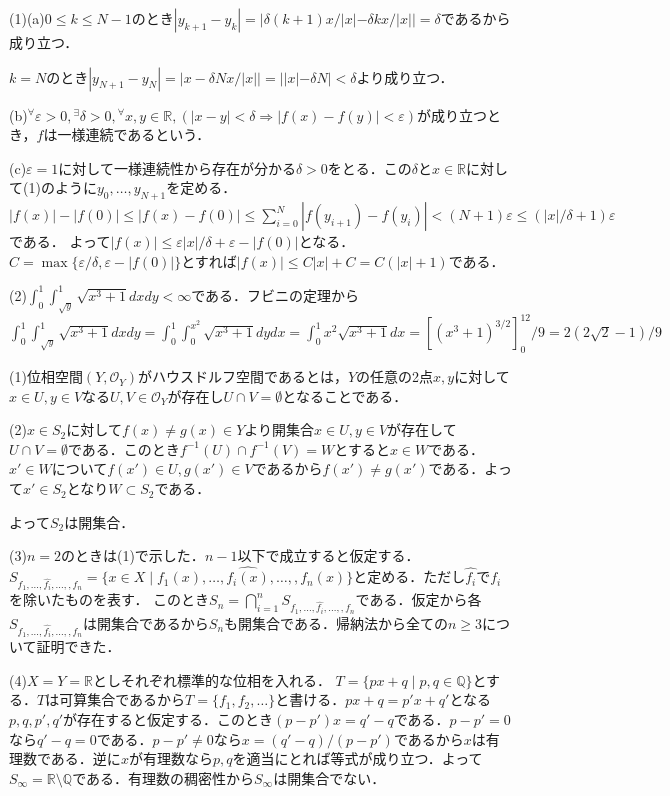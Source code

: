 \documentclass[
		book,
		head_space=20mm,
		foot_space=20mm,
		gutter=10mm,
		line_length=190mm
]{jlreq}
\begin{document}
(1)(a)$0\le k \le N-1$のとき$|y_{k+1}-y_k|=|\delta(k+1)x/|x|-\delta kx/|x||=\delta$であるから成り立つ．

$k=N$のとき$|y_{N+1}-y_N|=|x-\delta Nx/|x||=||x|-\delta N|<\delta$より成り立つ．

(b)${}^{\forall} \varepsilon>0,{}^{\exists} \delta>0,{}^\forall x,y \in \mathbb{R},(|x-y|<\delta \Rightarrow |f(x)-f(y)|<\varepsilon)$が成り立つとき，$f$は一様連続であるという．

(c)$\varepsilon=1$に対して一様連続性から存在が分かる$\delta>0$をとる．この$\delta$と$x \in \mathbb{R}$に対して(1)のように$y_0,\dots,y_{N+1}$を定める．
$|f(x)|-|f(0)|\le |f(x)-f(0)|\le \sum_{i=0}^N |f(y_{i+1})-f(y_i)|<(N+1)\varepsilon\le (|x|/\delta+1)\varepsilon$である．
よって$|f(x)|\le \varepsilon|x|/\delta+\varepsilon-|f(0)|$となる．
$C=\max \{ \varepsilon/\delta,\varepsilon-|f(0)|\}$とすれば$|f(x)|\le C|x|+C =C(|x|+1)$である．

(2)$\int_0^1\int_{\sqrt{y}}^1 \sqrt{x^3+1}dxdy<\infty$である．フビニの定理から$\int_0^1\int_{\sqrt{y}}^1 \sqrt{x^3+1}dxdy=\int_0^1\int_0^{x^2} \sqrt{x^3+1}dydx=\int_0^1x^2 \sqrt{x^3+1}dx=[(x^3+1)^{3/2}]_0^12/9=2(2\sqrt{2}-1)/9$

(1)位相空間$(Y,\mathcal{O}_Y)$がハウスドルフ空間であるとは，$Y$の任意の2点$x,y$に対して$x \in U,y \in V$なる$U,V \in \mathcal{O}_Y$が存在し$U \cap V =\emptyset$となることである．

(2)$x \in S_2$に対して$f(x)\neq g(x)\in Y$より開集合$x \in U,y \in V$が存在して$U \cap V=\emptyset$である．このとき$f^{-1}(U)\cap f^{-1}(V)=W$とすると$x \in W$である．$x' \in W$について$f(x')\in U,g(x')\in V$であるから$f(x')\neq g(x')$である．よって$x' \in S_2$となり$W \subset S_2$である．

よって$S_2$は開集合．

(3)$n=2$のときは(1)で示した．$n-1$以下で成立すると仮定する．
$S_{f_1,\dots,\hat{f_i},\dots,,f_n}=\{ x \in X \mid f_1(x),\dots,\hat{f_i(x)},\dots,,f_n(x)\}$と定める．ただし$\hat{f_i}$で$f_i$を除いたものを表す．
このとき$S_n=\bigcap\limits_{i=1}^n S_{f_1,\dots,\hat{f_i},\dots,,f_n}$である．仮定から各$S_{f_1,\dots,\hat{f_i},\dots,,f_n}$は開集合であるから$S_n$も開集合である．帰納法から全ての$n\ge 3$について証明できた．

(4)$X=Y=\mathbb{R}$としそれぞれ標準的な位相を入れる．
$T=\{ px+q \mid p,q \in \mathbb{Q}\}$とする．$T$は可算集合であるから$T=\{ f_1,f_2,\dots\}$と書ける．$px+q=p'x+q'$となる$p,q,p',q'$が存在すると仮定する．このとき$(p-p')x=q'-q$である．$p-p'=0$なら$q'-q=0$である．$p-p'\neq 0$なら$x=(q'-q)/(p-p')$であるから$x$は有理数である．逆に$x$が有理数なら$p,q$を適当にとれば等式が成り立つ．よって$S_{\infty}=\mathbb{R}\setminus \mathbb{Q}$である．有理数の稠密性から$S_{\infty}$は開集合でない．
\end{document}
